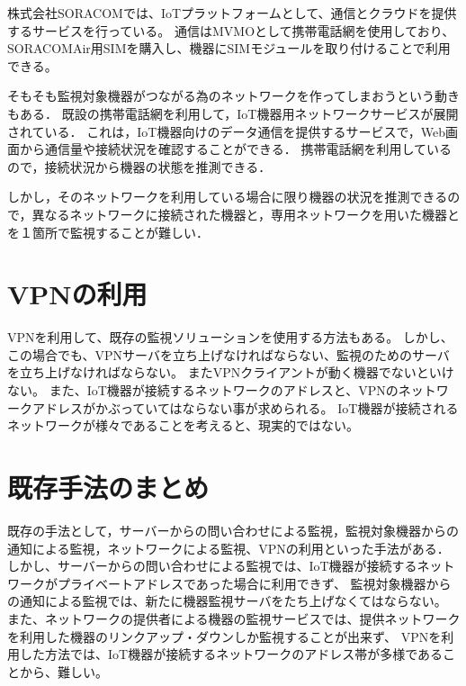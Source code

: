 	株式会社SORACOMでは、IoTプラットフォームとして、通信とクラウドを提供するサービスを行っている。
	通信はMVMOとして携帯電話網を使用しており、SORACOMAir用SIMを購入し、機器にSIMモジュールを取り付けることで利用できる。

	そもそも監視対象機器がつながる為のネットワークを作ってしまおうという動きもある．
	既設の携帯電話網を利用して，IoT機器用ネットワークサービスが展開されている．
	これは，IoT機器向けのデータ通信を提供するサービスで，Web画面から通信量や接続状況を確認することができる．
	携帯電話網を利用しているので，接続状況から機器の状態を推測できる．

	しかし，そのネットワークを利用している場合に限り機器の状況を推測できるので，異なるネットワークに接続された機器と，専用ネットワークを用いた機器とを１箇所で監視することが難しい．

\section{VPNの利用}
	VPNを利用して、既存の監視ソリューションを使用する方法もある。
	しかし、この場合でも、VPNサーバを立ち上げなければならない、監視のためのサーバを立ち上げなければならない。
	またVPNクライアントが動く機器でないといけない。
	また、IoT機器が接続するネットワークのアドレスと、VPNのネットワークアドレスがかぶっていてはならない事が求められる。
	IoT機器が接続されるネットワークが様々であることを考えると、現実的ではない。

\section{既存手法のまとめ}
	既存の手法として，サーバーからの問い合わせによる監視，監視対象機器からの通知による監視，ネットワークによる監視、VPNの利用といった手法がある．
	しかし、サーバーからの問い合わせによる監視では、IoT機器が接続するネットワークがプライベートアドレスであった場合に利用できず、
	監視対象機器からの通知による監視では、新たに機器監視サーバをたち上げなくてはならない。
	また、ネットワークの提供者による機器の監視サービスでは、提供ネットワークを利用した機器のリンクアップ・ダウンしか監視することが出来ず、
	VPNを利用した方法では、IoT機器が接続するネットワークのアドレス帯が多様であることから、難しい。
	
	







